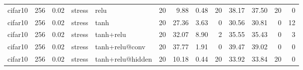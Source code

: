 \begin{table}[htbp]
{\begin{tabular}{@{}lrrllrrrrrrrr@{}}
cifar10 & 256 & 0.02 & stress & relu & 20 & 9.88 & 0.48 & 20 & 38.17 & 37.50 & 20 & 0 \\
cifar10 & 256 & 0.02 & stress & tanh & 20 & 27.36 & 3.63 & 0 & 30.56 & 30.81 & 0 & 12 \\
cifar10 & 256 & 0.02 & stress & tanh+relu & 20 & 32.07 & 8.90 & 2 & 35.55 & 35.43 & 0 & 3 \\
cifar10 & 256 & 0.02 & stress & tanh+relu@conv & 20 & 37.77 & 1.91 & 0 & 39.47 & 39.02 & 0 & 0 \\
cifar10 & 256 & 0.02 & stress & tanh+relu@hidden & 20 & 10.18 & 0.44 & 20 & 33.92 & 33.84 & 20 & 0 \\
\bottomrule
\end{tabular}}
\end{table}

